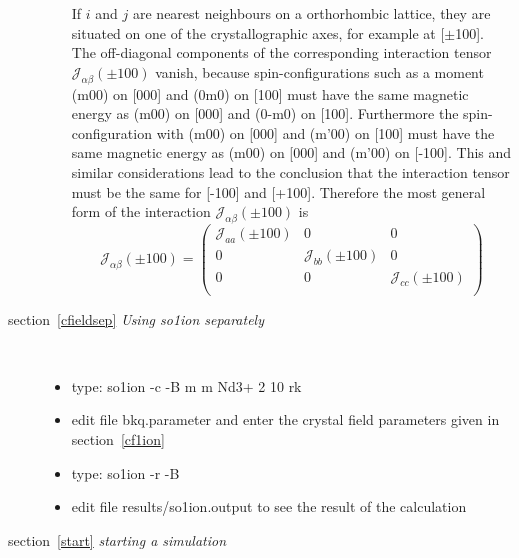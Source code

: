 \documentclass[twoside]{article}
\newcommand{\prg}{\sl}
\begin{document}
\begin{description}
\begin{enumerate}
 If $i$ and $j$ are nearest neighbours on a orthorhombic lattice, they are situated on one of the
 crystallographic axes, for example at [$\pm$100]. The off-diagonal components of the corresponding
 interaction tensor ${\mathcal J}_{\alpha\beta}(\pm100)$ vanish, because spin-configurations such as
 a moment (m00) on [000] and (0m0) on [100] must have the same magnetic energy as (m00) on [000] and
 (0-m0) on [100]. Furthermore the spin-configuration with (m00) on [000] and (m'00) on [100] must
 have the same magnetic energy as (m00) on [000] and (m'00) on [-100]. This and similar
 considerations lead to the conclusion that the interaction tensor must be the same for [-100] and
 [+100]. Therefore the most general form of the interaction ${\mathcal J}_{\alpha\beta}(\pm100)$
 is 
 \begin{equation}
 {\mathcal J}_{\alpha\beta}(\pm100)=\left(
 \begin{array}{ccc}
 {\mathcal J}_{aa}(\pm100) & 0 & 0 \\
 0 & {\mathcal J}_{bb}(\pm100) &  0 \\
 0 & 0 & {\mathcal J}_{cc}(\pm100) \\
 \end{array}
 \right)
 \end{equation}
 \end{enumerate}
\item[section~\ref{cfieldsep} {\em Using {\prg so1ion} separately}] \ 
 \begin{itemize}
 \item type: so1ion -c -B m m Nd3+ 2 10 rk
 \item edit file bkq.parameter and enter the crystal field parameters given in section~\ref{cf1ion}
 \item type: so1ion -r -B
 \item edit file results/so1ion.output to see the result of the calculation
 \end{itemize}
\item[section~\ref{start} {\em starting a simulation}] \ 


\end{description}
\end{document}
